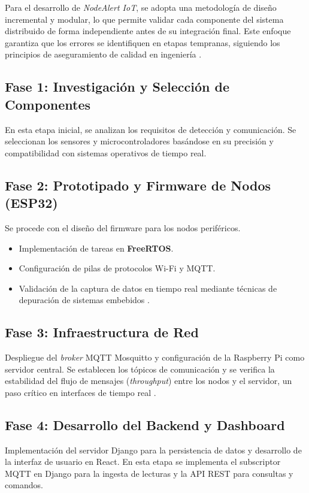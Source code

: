 
Para el desarrollo de \textit{NodeAlert IoT}, se adopta una metodología de diseño incremental y modular, lo que permite validar cada componente del sistema distribuido de forma independiente antes de su integración final. Este enfoque garantiza que los errores se identifiquen en etapas tempranas, siguiendo los principios de aseguramiento de calidad en ingeniería \citep{alexander2006}.

\subsection{Fase 1: Investigación y Selección de Componentes}
En esta etapa inicial, se analizan los requisitos de detección y comunicación. Se seleccionan los sensores y microcontroladores basándose en su precisión y compatibilidad con sistemas operativos de tiempo real.

\subsection{Fase 2: Prototipado y Firmware de Nodos (ESP32)}
Se procede con el diseño del firmware para los nodos periféricos. 
\begin{itemize}
    \item Implementación de tareas en \textbf{FreeRTOS}.
    \item Configuración de pilas de protocolos Wi-Fi y MQTT.
    \item Validación de la captura de datos en tiempo real mediante técnicas de depuración de sistemas embebidos \citep{valvano2014volume1}.
\end{itemize}

\subsection{Fase 3: Infraestructura de Red}
Despliegue del \textit{broker} MQTT Mosquitto y configuración de la Raspberry Pi como servidor central. Se establecen los tópicos de comunicación y se verifica la estabilidad del flujo de mensajes (\textit{throughput}) entre los nodos y el servidor, un paso crítico en interfaces de tiempo real \citep{valvano2014volume2}.

\subsection{Fase 4: Desarrollo del Backend y Dashboard}
Implementación del servidor Django para la persistencia de datos y desarrollo de la interfaz de usuario en React. En esta etapa se implementa el subscriptor MQTT en Django para la ingesta de lecturas y la API REST para consultas y comandos.


